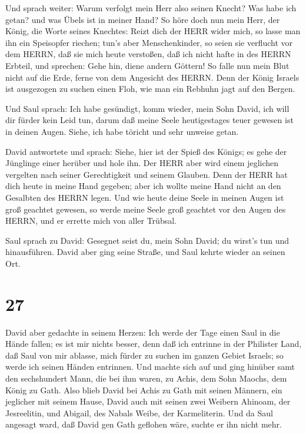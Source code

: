  Und sprach weiter: Warum verfolgt mein Herr also seinen
Knecht? Was habe ich getan? und was Übels ist in meiner Hand?
 So höre doch nun mein Herr, der König, die Worte seines
Knechtes: Reizt dich der HERR wider mich, so lasse man ihn ein
Speisopfer riechen; tun's aber Menschenkinder, so seien sie verflucht
vor dem HERRN, daß sie mich heute verstoßen, daß ich nicht hafte in des
HERRN Erbteil, und sprechen: Gehe hin, diene andern Göttern!
 So falle nun mein Blut nicht auf die Erde, ferne von dem
Angesicht des HERRN. Denn der König Israels ist ausgezogen zu suchen
einen Floh, wie man ein Rebhuhn jagt auf den Bergen.

 Und Saul sprach: Ich habe gesündigt, komm wieder, mein
Sohn David, ich will dir fürder kein Leid tun, darum daß meine Seele
heutigestages teuer gewesen ist in deinen Augen. Siehe, ich habe töricht
und sehr unweise getan.

 David antwortete und sprach: Siehe, hier ist der Spieß des
Königs; es gehe der Jünglinge einer herüber und hole ihn. 
Der HERR aber wird einem jeglichen vergelten nach seiner Gerechtigkeit
und seinem Glauben. Denn der HERR hat dich heute in meine Hand gegeben;
aber ich wollte meine Hand nicht an den Gesalbten des HERRN legen.
 Und wie heute deine Seele in meinen Augen ist groß
geachtet gewesen, so werde meine Seele groß geachtet vor den Augen des
HERRN, und er errette mich von aller Trübsal.

 Saul sprach zu David: Gesegnet seist du, mein Sohn David;
du wirst's tun und hinausführen. David aber ging seine Straße, und Saul
kehrte wieder an seinen Ort.

\hypertarget{section-26}{%
\section{27}\label{section-26}}

 David aber gedachte in seinem Herzen: Ich werde der Tage
einen Saul in die Hände fallen; es ist mir nichts besser, denn daß ich
entrinne in der Philister Land, daß Saul von mir ablasse, mich fürder zu
suchen im ganzen Gebiet Israels; so werde ich seinen Händen entrinnen.
 Und machte sich auf und ging hinüber samt den sechshundert
Mann, die bei ihm waren, zu Achis, dem Sohn Maochs, dem König zu Gath.
 Also blieb David bei Achis zu Gath mit seinen Männern, ein
jeglicher mit seinem Hause, David auch mit seinen zwei Weibern Ahinoam,
der Jesreelitin, und Abigail, des Nabals Weibe, der Karmeliterin.
 Und da Saul angesagt ward, daß David gen Gath geflohen
wäre, suchte er ihn nicht mehr.

